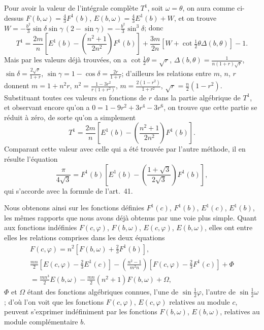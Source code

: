 \documentclass{article}
\begin{document}
Pour avoir la valeur de l'intégrale complète $T^{1}$, soit $\omega=\theta$, on aura comme ci-dessus $F(b,\omega)=\frac{4}{3}F^{1}(b)$, $E(b,\omega)=\frac{4}{3}E^{1}(b)+W$, et on trouve $W=-\frac{b^{2}}{3}\sin\delta\sin\gamma\,(2-\sin\gamma)=-\frac{b^{2}}{3}\sin^{3}\delta$; donc
\[ T^{1}=\frac{2m}{n}\left[E^{1}(b)-\left(\frac{n^{2}+1}{2n^{2}}\right)F^{1}(b)\right]+\frac{3m}{2n}[W+\cot\tfrac{1}{2}\theta\Delta(b,\theta)]-1. \]
Mais par les valeurs déjà trouvées, on a $\cot\frac{1}{2}\theta=\sqrt{r}$, $\Delta(b,\theta)=\frac{1}{n(1+r)\sqrt{r}}$, $\sin\delta=\frac{2\sqrt{r}}{1+r}$, $\sin\gamma=1-\cos\delta=\frac{2r}{1+r}$; d'ailleurs les relations entre $m$, $n$, $r$ donnent $m=1+n^{2}r$, $n^{2}=\frac{1-3r^{2}}{r(1+r^{2})}$, $m=\frac{2(1-r^{2})}{1+r^{2}}$, $\sqrt{r}=\frac{n}{2}(1-r^{2})$. Substituant toutes ces valeurs en fonctions de $r$ dans la partie algébrique de $T^{1}$, et observant encore qu'on a $0=1-9r^{2}+3r^{4}-3r^{6}$, on trouve que cette partie se réduit à zéro, de sorte qu'on a simplement
\[ T^{1}=\frac{2m}{n}\left[E^{1}(b)-\left(\frac{n^{2}+1}{2n^{2}}\right)F^{1}(b)\right]. \]
Comparant cette valeur avec celle qui a été trouvée par l'autre méthode, il en résulte l'équation
\[ \frac{\pi}{4\sqrt{3}}=F^{1}(b)\left[E^{1}(b)-\left(\frac{1+\sqrt{3}}{2\sqrt{3}}\right)F^{1}(b)\right], \]
qui s'accorde avec la formule de l'art.\ 41.


Nous obtenons ainsi sur les fonctions définies $F^{1}(c)$, $F^{1}(b)$, $E^{1}(c)$, $E^{1}(b)$, les mêmes rapports que nous avons déjà obtenus par une voie plus simple. Quant aux fonctions indéfinies $F(c,\varphi)$, $F(b,\omega)$, $E(c,\varphi)$, $E(b,\omega)$, elles ont entre elles les relations comprises dans les deux équations
\[ \begin{gathered} F(c,\varphi)=n^{2}[F(b,\omega)+\tfrac{2}{3}F^{1}(b)],\\ \frac{mn}{2}[E(c,\varphi)-\tfrac{2}{3}E^{1}(c)]-\left(\frac{n^{2}-1}{m^{2}n}\right)[F(c,\varphi)-\tfrac{2}{3}F^{1}(c)]+\Phi\\ =\frac{mn^{3}}{2}E(b,\omega)-\frac{mn}{2}(n^{2}+1)F(b,\omega)+\Omega, \end{gathered} \]
$\Phi$ et $\Omega$ étant des fonctions algébriques connues, l'une de $\sin\frac{1}{2}\varphi$, l'autre de $\sin\frac{1}{2}\omega$; d'où l'on voit que les fonctions $F(c,\varphi)$, $E(c,\varphi)$ relatives au module $c$, peuvent s'exprimer indéfiniment par les fonctions $F(b,\omega)$, $E(b,\omega)$, relatives au module complémentaire $b$.
\end{document}
